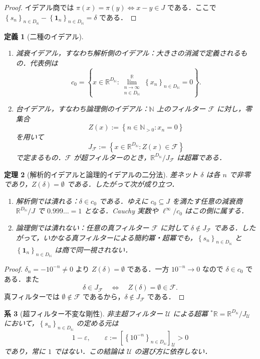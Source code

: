 \documentclass[a4paper,11pt]{ltjsarticle}
\theoremstyle{jpdef}
\newtheorem{definition}{定義}[section]
\theoremstyle{jpthm}
\newtheorem{theorem}[definition]{定理}
\newtheorem{corollary}[definition]{系}
\newcommand{\N}{\mathbb{N}}
\newcommand{\R}{\mathbb{R}}
\newcommand{\Ns}{\N_{>0}}
\newcommand{\DN}{D_{\N}}
\newcommand{\set}[1]{\left\{#1\right\}}
\newcommand{\seq}[2]{\left\{#1\right\}_{#2}}
\newcommand{\ulim}[1]{{}^{\ast}#1}
\newcommand{\eps}{\varepsilon}
\begin{document}
\begin{proof}
イデアル商では \(\pi(x)=\pi(y)\Longleftrightarrow x-y\in J\) である．ここで \(\seq{s_n}{n\in\DN}-\seq{\mathbf1_n}{n\in\DN}=\delta\) である．
\end{proof}

\begin{definition}[二種のイデアル]
\begin{enumerate}
\item 減衰イデアル，すなわち解析側のイデアル：大きさの消滅で定義されるもの．代表例は
\[
  c_0=\set{x\in\R^{\DN}:\lim_{\substack{n\to\infty\\ n\in\DN}}^{\R}\seq{x_n}{n\in\DN}=0}.
\]
\item 台イデアル，すなわち論理側のイデアル：\(\N\) 上のフィルター \(\mathcal F\) に対し，零集合
\[
  Z(x):=\set{n\in\Ns:x_n=0}
\]
を用いて
\[
  J_{\mathcal F}:=\set{x\in\R^{\DN}:Z(x)\in\mathcal F}
\]
で定まるもの．\(\mathcal F\) が超フィルターのとき，\(\R^{\DN}/J_{\mathcal F}\) は超冪である．
\end{enumerate}
\end{definition}

\begin{theorem}[解析的イデアルと論理的イデアルの二分法]
差ネット \(\delta\) は各 \(n\) で非零であり，\(Z(\delta)=\emptyset\) である．したがって次が成り立つ．
\begin{enumerate}
\item 解析側では潰れる：\(\delta\in c_0\) である．ゆえに \(c_0\subseteq J\) を満たす任意の減衰商 \(\R^{\DN}/J\) で \(0.999\ldots=1\) となる．Cauchy 実数や \(\ell^\infty/c_0\) はこの側に属する．
\item 論理側では潰れない：任意の真フィルター \(\mathcal F\) に対して \(\delta\notin J_{\mathcal F}\) である．したがって，いかなる真フィルターによる簡約冪・超冪でも，\(\seq{s_n}{n\in\DN}\) と \(\seq{\mathbf1_n}{n\in\DN}\) は商で同一視されない．
\end{enumerate}
\end{theorem}

\begin{proof}
\(\delta_n=-10^{-n}\ne0\) より \(Z(\delta)=\emptyset\) である．一方 \(10^{-n}\to0\) なので \(\delta\in c_0\) である．また
\[
  \delta\in J_{\mathcal F}
  \quad\Longleftrightarrow\quad
  Z(\delta)=\emptyset\in\mathcal F.
\]
真フィルターでは \(\emptyset\notin\mathcal F\) であるから，\(\delta\notin J_{\mathcal F}\) である．
\end{proof}

\begin{corollary}[超フィルター不変な剛性]
非主超フィルター \(\mathcal U\) による超冪 \(\ulim\R=\R^{\DN}/J_{\mathcal U}\) において，\(\seq{s_n}{n\in\DN}\) の定める元は
\[
  1-\eps,
  \qquad
  \eps:=[\seq{10^{-n}}{n\in\DN}]_{\mathcal U}>0
\]
であり，常に \(1\) ではない．この結論は \(\mathcal U\) の選び方に依存しない．
\end{corollary}
\end{document}
